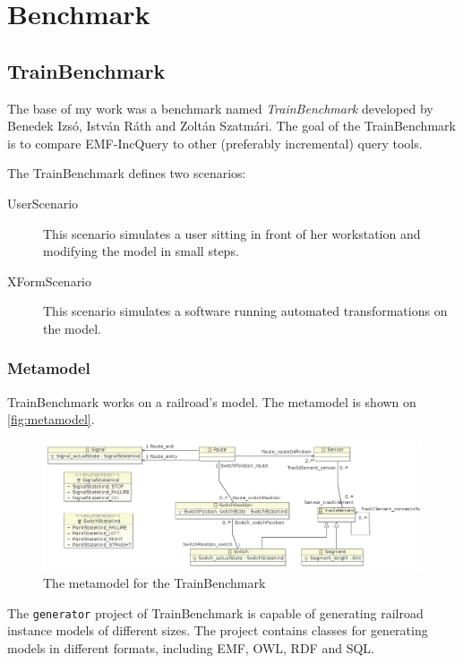 \chapter{Benchmark}

\section{TrainBenchmark}

The base of my work was a benchmark named \textit{TrainBenchmark} developed by Benedek Izsó, István Ráth and Zoltán Szatmári. The goal of the TrainBenchmark is to compare EMF-IncQuery \cite{incquery} to other (preferably incremental) query tools.

The TrainBenchmark defines two scenarios:

\begin{description}
  \item[UserScenario] This scenario simulates a user sitting in front of her workstation and modifying the model in small steps.
  \item[XFormScenario] This scenario simulates a software running automated transformations on the model.
\end{description}

\subsection{Metamodel}

TrainBenchmark works on a railroad's model. The metamodel is shown on \autoref{fig:metamodel}.

\begin{figure}
\begin{center}
\includegraphics[width=14cm]{figures/TrainMetamodel}
\caption{The metamodel for the TrainBenchmark}
\label{fig:metamodel}
\end{center}
\end{figure}

The \texttt{generator} project of TrainBenchmark is capable of generating railroad instance models of different sizes. The project contains classes for generating models in different formats, including EMF, OWL, RDF and SQL.

